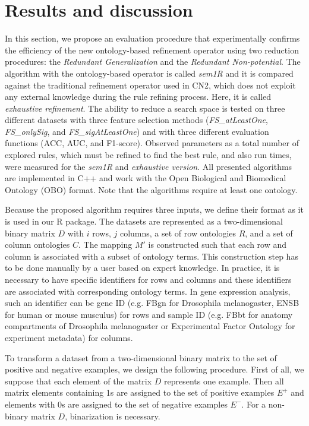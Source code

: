 \documentclass{bmcart}
\begin{document}
\section*{Results and discussion}
In this section, we propose an evaluation procedure that experimentally confirms the efficiency of the new ontology-based refinement operator using two reduction procedures: the \emph{Redundant Generalization} and the \emph{Redundant Non-potential}. The algorithm with the ontology-based operator is called \emph{sem1R} and it is compared against the traditional refinement operator used in CN2, which does not exploit any external knowledge during the rule refining process. Here, it is called \emph{exhaustive refinement}.
The ability to reduce a search space is tested on three different datasets with three feature selection methods (\emph{FS\_atLeastOne}, \emph{FS\_onlySig}, and \emph{FS\_sigAtLeastOne}) and with three different evaluation functions (ACC, AUC, and F1-score). Observed parameters as a total number of explored rules, which must be refined to find the best rule, and also run times, were measured for the \emph{sem1R} and \emph{exhaustive version}.
All presented algorithms are implemented in C++ and work with the Open Biological and Biomedical Ontology (OBO) format. Note that the algorithms require at least one ontology.

Because the proposed algorithm requires three inputs, we define their format as it is used in our R package.
The datasets are represented as a two-dimensional binary matrix $D$ with $i$ rows, $j$ columns, a set of row ontologies $R$, and a set of column ontologies $C$. The mapping $M'$ is constructed such that each row and column is associated with a subset of ontology terms. This construction step has to be done manually by a user based on expert knowledge. In practice, it is necessary to have specific identifiers for rows and columns and these identifiers are associated with corresponding ontology terms. In gene expression analysis, such an identifier can be gene ID (e.g. FBgn for Drosophila melanogaster, ENSB for human or mouse musculus) for rows and sample ID (e.g. FBbt for anatomy compartments of Drosophila melanogaster or Experimental Factor Ontology for experiment metadata) for columns.

To transform a dataset from a two-dimensional binary matrix to the set of positive and negative examples, we design the following procedure. First of all, we suppose that each element of the matrix $D$ represents one example. Then all matrix elements containing 1s are assigned to the set of positive examples $E^{+}$ and elements with 0s are assigned to the set of negative examples $E^{-}$. For a non-binary matrix $D$, binarization is necessary.
\end{document}
